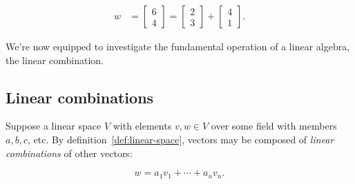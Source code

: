 \documentclass{article}
\begin{document}
\begin{align}
  w &= \begin{bmatrix}6\\
             4\end{bmatrix} =
\begin{bmatrix}2\\
             3\end{bmatrix} +
\begin{bmatrix}4\\
             1\end{bmatrix}.
\end{align}

We're now equipped to investigate the fundamental operation
of a linear algebra, the linear combination.

\subsection{Linear combinations}

Suppose a linear space $V$ with elements $v, w \in V$ over some field
with members $a, b, c$, etc.
By definition~\ref{def:linear-space}, vectors may be composed of
\textit{linear combinations} of other vectors:

\begin{equation}
  w = a_1v_1 + \cdots + a_nv_n.
\end{equation}

\begin{comment}
  Primary concern here is establishing the equivalence between
  the number of linearly independent basis vectors and the dimension
  of the vector space.
\end{comment}

\begin{comment}
  From Wikipedia on Operads:
  \begin{quote}
    This point of view formalizes the
    notion that linear combinations are the most general sort of operation on a
    vector space – saying that a vector space is an algebra over the operad of
    linear combinations is precisely the statement that all possible algebraic
    operations in a vector space are linear combinations. The basic operations
    of vector addition and scalar multiplication are a generating set for the
    operad of all linear combinations, while the linear combinations operad
    canonically encodes all possible operations on a vector space.
  \end{quote}

\end{comment}
\end{document}
